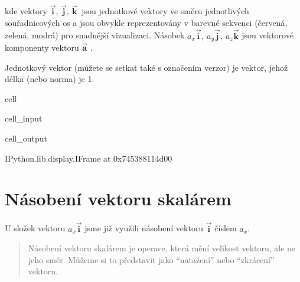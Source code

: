 \documentclass[letterpaper,10pt,english]{jupyterBook}
\begin{document}
\sphinxAtStartPar
kde vektory  \( \vec{\mathbf{i}}, \, \vec{\mathbf{j}}, \, \vec{\mathbf{k}} \, \) jsou jednotkové vektory ve směru jednotlivých souřadnicových os a jsou obvykle reprezentovány v barevné sekvenci  (červená, zelená, modrá) pro snadnější vizualizaci. Násobek \(a_x \vec{\mathbf{i}}, \: a_y \vec{\mathbf{j}}, \: a_z \vec{\mathbf{k}} \) jsou vektorové komponenty vektoru  \(\vec{\mathbf{a}}\) .

\sphinxAtStartPar
Jednotkový vektor (můžete se setkat také s označením verzor) je vektor, jehož délka (nebo norma) je 1.

\begin{sphinxuseclass}{cell}\begin{sphinxVerbatimInput}

\begin{sphinxuseclass}{cell_input}
\begin{sphinxVerbatim}[commandchars=\\\{\}]
  
\end{sphinxVerbatim}

\end{sphinxuseclass}\end{sphinxVerbatimInput}
\begin{sphinxVerbatimOutput}

\begin{sphinxuseclass}{cell_output}
\begin{sphinxVerbatim}[commandchars=\\\{\}]
\PYGZlt{}IPython.lib.display.IFrame at 0x745388114d00\PYGZgt{}
\end{sphinxVerbatim}

\end{sphinxuseclass}\end{sphinxVerbatimOutput}

\end{sphinxuseclass}

\section{Násobení vektoru skalárem}
\label{\detokenize{Prednasky/0_2_Skal_xe1ry_a_vektory:nasobeni-vektoru-skalarem}}
\sphinxAtStartPar
U složek vektoru \({a_x}\vec{\mathbf{i}}\) jsme již využili násobení vektoru \(\vec{\mathbf{i}}\) číslem \(a_x\).
\begin{quote}

\sphinxAtStartPar
Násobení vektoru skalárem je operace, která mění velikost vektoru, ale ne jeho směr. Můžeme si to představit jako “natažení” nebo “zkrácení” vektoru.
\end{quote}
\end{document}
